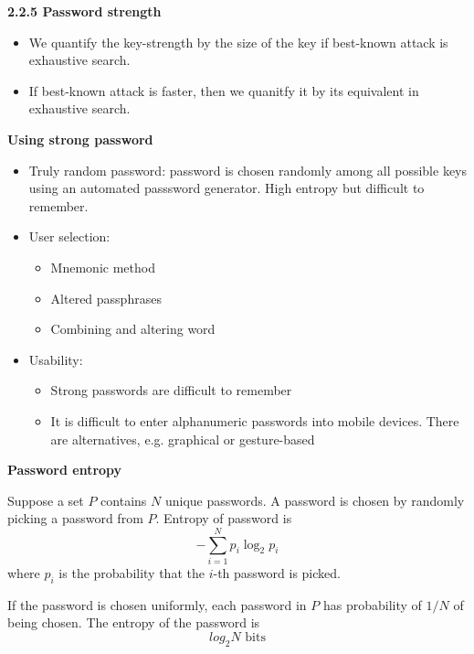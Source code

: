 \documentclass[landscape,a4paper]{extarticle}
\begin{document}
\begin{multicols*}{5}
    \textbf{2.2.5 Password strength}
    \begin{itemize}
        \item We quantify the key-strength by the size of the key if best-known attack is exhaustive search.
        \item If best-known attack is faster, then we quanitfy it by its equivalent in exhaustive search.
    \end{itemize}

    \textbf{Using strong password}
    \begin{itemize}
        \item Truly random password: password is chosen randomly among all possible keys using an automated passsword
        generator. High entropy but difficult to remember.
        \item User selection: 
        \begin{itemize}
            \item Mnemonic method
            \item Altered passphrases
            \item Combining and altering word
        \end{itemize}
        \item Usability:
        \begin{itemize}
            \item Strong passwords are difficult to remember
            \item It is difficult to enter alphanumeric passwords into mobile devices. There are alternatives,
            e.g. graphical or gesture-based
        \end{itemize}
    \end{itemize}

    \textbf{Password entropy}

    Suppose a set $P$ contains $N$ unique passwords. A password is chosen by randomly picking
    a password from $P$. Entropy of password is
    \begin{equation*}
        -\sum_{i=1}^N p_i \log_2p_i
    \end{equation*}
    where $p_i$ is the probability that the $i$-th password is picked.

    If the password is chosen uniformly, each password in $P$ has probability of $1/N$ of
    being chosen. The entropy of the password is
    \begin{equation*}
        log_2N \text{ bits}
    \end{equation*}


\end{multicols*}
\end{document}
